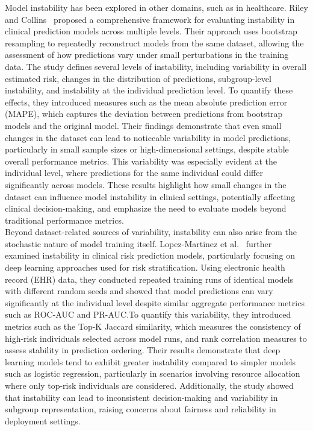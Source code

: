 \documentclass[12pt]{article}
\begin{document}
Model instability has been explored in other domains, such as in healthcare. Riley and Collins~\cite{riley2023stability} proposed a comprehensive framework for evaluating instability in clinical prediction models across multiple levels. Their approach uses bootstrap resampling to repeatedly reconstruct models from the same dataset, allowing the assessment of how predictions vary under small perturbations in the training data. The study defines several levels of instability, including variability in overall estimated risk, changes in the distribution of predictions, subgroup-level instability, and instability at the individual prediction level. To quantify these effects, they introduced measures such as the mean absolute prediction error (MAPE), which captures the deviation between predictions from bootstrap models and the original model. Their findings demonstrate that even small changes in the dataset can lead to noticeable variability in model predictions, particularly in small sample sizes or high-dimensional settings, despite stable overall performance metrics. This variability was especially evident at the individual level, where predictions for the same individual could differ significantly across models. These results highlight how small changes in the dataset can influence model instability in clinical settings, potentially affecting clinical decision-making, and emphasize the need to evaluate models beyond traditional performance metrics. \\

Beyond dataset-related sources of variability, instability can also arise from the stochastic nature of model training itself. Lopez-Martinez et al.~\cite{lopez2022instability} further examined instability in clinical risk prediction models, particularly focusing on deep learning approaches used for risk stratification. Using electronic health record (EHR) data, they conducted repeated training runs of identical models with different random seeds and showed that model predictions can vary significantly at the individual level despite similar aggregate performance metrics such as ROC-AUC and PR-AUC.\@ To quantify this variability, they introduced metrics such as the Top-K Jaccard similarity, which measures the consistency of high-risk individuals selected across model runs, and rank correlation measures to assess stability in prediction ordering. Their results demonstrate that deep learning models tend to exhibit greater instability compared to simpler models such as logistic regression, particularly in scenarios involving resource allocation where only top-risk individuals are considered. Additionally, the study showed that instability can lead to inconsistent decision-making and variability in subgroup representation, raising concerns about fairness and reliability in deployment settings.\\
\end{document}
